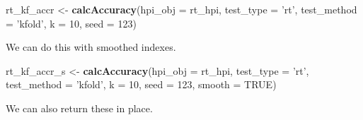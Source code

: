 \documentclass[]{article}
\newenvironment{Shaded}{\begin{snugshade}}{\end{snugshade}}
\newcommand{\KeywordTok}[1]{\textcolor[rgb]{0.13,0.29,0.53}{\textbf{#1}}}
\newcommand{\DataTypeTok}[1]{\textcolor[rgb]{0.13,0.29,0.53}{#1}}
\newcommand{\DecValTok}[1]{\textcolor[rgb]{0.00,0.00,0.81}{#1}}
\newcommand{\StringTok}[1]{\textcolor[rgb]{0.31,0.60,0.02}{#1}}
\newcommand{\OtherTok}[1]{\textcolor[rgb]{0.56,0.35,0.01}{#1}}
\newcommand{\OperatorTok}[1]{\textcolor[rgb]{0.81,0.36,0.00}{\textbf{#1}}}
\newcommand{\NormalTok}[1]{#1}
\begin{document}
\begin{Shaded}
\begin{Highlighting}[]
\NormalTok{  rt_kf_accr <-}\StringTok{ }\KeywordTok{calcAccuracy}\NormalTok{(}\DataTypeTok{hpi_obj =}\NormalTok{ rt_hpi,}
                             \DataTypeTok{test_type =} \StringTok{'rt'}\NormalTok{,}
                             \DataTypeTok{test_method =} \StringTok{'kfold'}\NormalTok{,}
                             \DataTypeTok{k =} \DecValTok{10}\NormalTok{,}
                             \DataTypeTok{seed =} \DecValTok{123}\NormalTok{)}
\end{Highlighting}
\end{Shaded}

We can do this with smoothed indexes.

\begin{Shaded}
\begin{Highlighting}[]
\NormalTok{  rt_kf_accr_s <-}\StringTok{ }\KeywordTok{calcAccuracy}\NormalTok{(}\DataTypeTok{hpi_obj =}\NormalTok{ rt_hpi,}
                               \DataTypeTok{test_type =} \StringTok{'rt'}\NormalTok{,}
                               \DataTypeTok{test_method =} \StringTok{'kfold'}\NormalTok{,}
                               \DataTypeTok{k =} \DecValTok{10}\NormalTok{,}
                               \DataTypeTok{seed =} \DecValTok{123}\NormalTok{,}
                               \DataTypeTok{smooth =} \OtherTok{TRUE}\NormalTok{)}
\end{Highlighting}
\end{Shaded}

We can also return these in place.

\begin{Shaded}
\end{Shaded}
\end{document}
